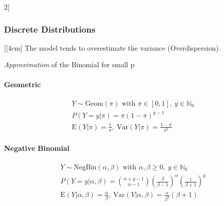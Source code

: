 \documentclass[8pt]{extarticle}
\begin{document}
\begin{multicols}{2}[\subsubsection{Discrete Distributions}][4cm]
\noindent The model tends to overestimate the variance (Overdispersion).
  
\noindent   \textit{Approximation} of the Binomial for small p

  
    \paragraph{Geometric}

  \begin{align*}
    & Y \sim \mathrm{Geom}(\pi) \text{ with } \pi \in \left[0,1\right] ,\: y \in \mathbb{N}_0 \\
    & P(Y=y|\pi) = \pi(1-\pi)^{y-1} \\
    & \mathrm{E}(Y|\pi) = \frac{1}{\pi} ,\: \mathrm{Var}(Y|\pi) = \frac{1-\pi}{\pi^2}
  \end{align*}
  
    \paragraph{Negative Binomial}

  \begin{align*}
    & Y \sim \mathrm{NegBin}(\alpha, \beta) \text{ with } \alpha, \beta \geq 0 ,\: y \in \mathbb{N}_0 \\
    & P(Y=y|\alpha, \beta) = \binom{\alpha + y - 1}{\alpha - 1} \left(\frac{\beta}{\beta - 1}\right)^{\alpha} \left(\frac{1}{\beta + 1}\right)^y \\
    & \mathrm{E}(Y|\alpha,\beta) = \frac{\alpha}{\beta} ,\: \mathrm{Var}(Y|\alpha,\beta) = \frac{\alpha}{\beta^2}(\beta+1)
  \end{align*}

\end{multicols}
\end{document}
